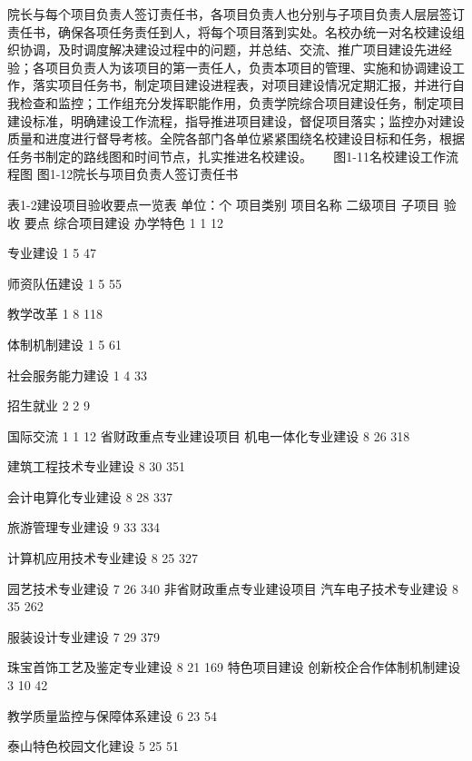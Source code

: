 院长与每个项目负责人签订责任书，各项目负责人也分别与子项目负责人层层签订责任书，确保各项任务责任到人，将每个项目落到实处。名校办统一对名校建设组织协调，及时调度解决建设过程中的问题，并总结、交流、推广项目建设先进经验；各项目负责人为该项目的第一责任人，负责本项目的管理、实施和协调建设工作，落实项目任务书，制定项目建设进程表，对项目建设情况定期汇报，并进行自我检查和监控；工作组充分发挥职能作用，负责学院综合项目建设任务，制定项目建设标准，明确建设工作流程，指导推进项目建设，督促项目落实；监控办对建设质量和进度进行督导考核。全院各部门各单位紧紧围绕名校建设目标和任务，根据任务书制定的路线图和时间节点，扎实推进名校建设。
 　     
图1-11名校建设工作流程图         图1-12院长与项目负责人签订责任书





表1-2建设项目验收要点一览表      单位：个
项目类别
项目名称
二级项目
子项目
验收
要点
综合项目建设
办学特色
1
1
12

专业建设
1
5
47

师资队伍建设
1
5
55

教学改革
1
8
118

体制机制建设
1
5
61

社会服务能力建设
1
4
33

招生就业
2
2
9

国际交流
1
1
12
省财政重点专业建设项目
机电一体化专业建设
8
26
318

建筑工程技术专业建设
8
30
351

会计电算化专业建设
8
28
337

旅游管理专业建设
9
33
334

计算机应用技术专业建设
8
25
327

园艺技术专业建设
7
26
340
非省财政重点专业建设项目
汽车电子技术专业建设
8
35
262

服装设计专业建设
7
29
379

珠宝首饰工艺及鉴定专业建设
8
21
169
特色项目建设
创新校企合作体制机制建设
3
10
42

教学质量监控与保障体系建设
6
23
54

泰山特色校园文化建设
5
25
51

